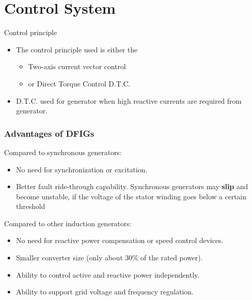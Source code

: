 \documentclass{beamer}
\begin{document}
\section{Control System}

\begin{frame}{Control principle}

\begin{itemize}
 \item  The control principle used is either the 

\begin{itemize}
    \item Two-axis current vector control 
    \item or Direct Torque Control D.T.C.
\end{itemize}

\item D.T.C. used for generator when high reactive currents are required from generator. 
   
\end{itemize}
    
\end{frame}

\begin{frame}
  \frametitle{Advantages of DFIGs}
  \begin{block}{Compared to synchronous generators:}
    \begin{itemize}
      \item No need for synchronization or excitation.
      \item Better fault ride-through capability. Synchronous generators may \textbf{slip} and become unstable, if the voltage of the stator winding goes below a certain threshold
    \end{itemize}
  \end{block}
  \begin{block}{Compared to other induction generators:}
    \begin{itemize}
      \item No need for reactive power compensation or speed control devices.
      \item Smaller converter size (only about 30\% of the rated power).
      \item Ability to control active and reactive power independently.
      \item Ability to support grid voltage and frequency regulation.
    \end{itemize}
  \end{block}
\end{frame}
\end{document}

